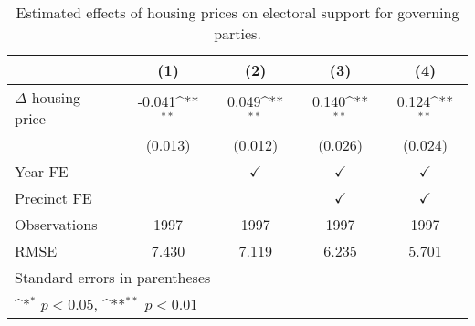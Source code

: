 \begin{table}[htbp]\centering
\def\sym#1{\ifmmode^{#1}\else\(^{#1}\)\fi}
\caption{Estimated effects of housing prices on electoral support for governing parties.} \label{predv}
\begin{tabular}{l*{4}{c}}
\hline\hline
                    &\multicolumn{1}{c}{(1)}        &\multicolumn{1}{c}{(2)}        &\multicolumn{1}{c}{(3)}        &\multicolumn{1}{c}{(4)}        \\
\hline
$\Delta$ housing price&      -0.041\sym{**}&       0.049\sym{**}&       0.140\sym{**}&       0.124\sym{**}\\
                    &     (0.013)        &     (0.012)        &     (0.026)        &     (0.024)        \\
[1em]
\hline Year FE      &                    &$\checkmark$        &$\checkmark$        &$\checkmark$        \\
[1em]
Precinct FE         &                    &                    &$\checkmark$        &$\checkmark$        \\
\hline
Observations        &        1997        &        1997        &        1997        &        1997        \\
RMSE                &       7.430        &       7.119        &       6.235        &       5.701        \\
\hline\hline
\multicolumn{5}{l}{\footnotesize Standard errors in parentheses}\\
\multicolumn{5}{l}{\footnotesize \sym{*} \(p<0.05\), \sym{**} \(p<0.01\)}\\
\end{tabular}
\end{table}
